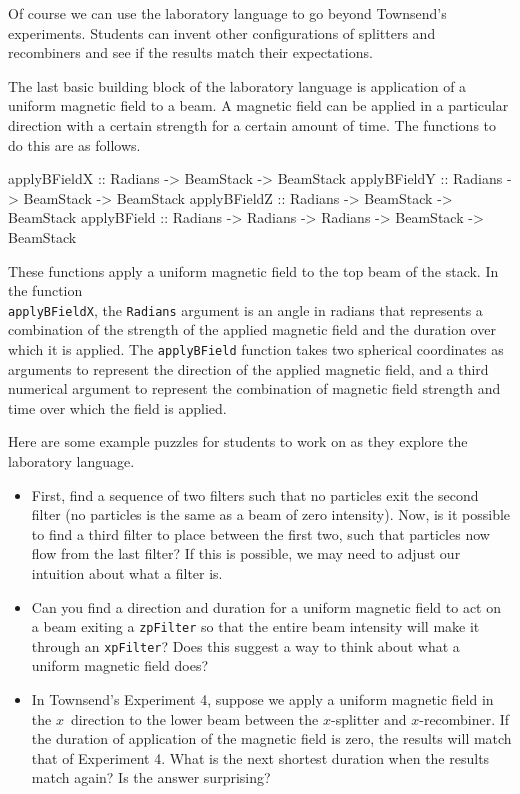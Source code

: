\documentclass{eptcs}
\newcommand{\DataTypeTok}[1]{\textcolor[rgb]{0.56,0.13,0.00}{{#1}}}
\newcommand{\SpecialCharTok}[1]{\textcolor[rgb]{0.25,0.44,0.63}{{#1}}}
\newcommand{\FunctionTok}[1]{\textcolor[rgb]{0.02,0.16,0.49}{{#1}}}
\begin{document}
Of course we can use the laboratory language to go beyond Townsend's
experiments.  Students can invent other configurations of splitters
and recombiners and see if the results match their expectations.

The last basic building block of the laboratory language
is application of a uniform magnetic field to a beam.
A magnetic field can be applied in a particular direction
with a certain strength for a certain amount of time.
The functions to do this are as follows.
\begin{Highlighting}[]
\FunctionTok{applyBFieldX} \SpecialCharTok{::} \DataTypeTok{Radians} \SpecialCharTok{->} \DataTypeTok{BeamStack} \SpecialCharTok{->} \DataTypeTok{BeamStack}
\FunctionTok{applyBFieldY} \SpecialCharTok{::} \DataTypeTok{Radians} \SpecialCharTok{->} \DataTypeTok{BeamStack} \SpecialCharTok{->} \DataTypeTok{BeamStack}
\FunctionTok{applyBFieldZ} \SpecialCharTok{::} \DataTypeTok{Radians} \SpecialCharTok{->} \DataTypeTok{BeamStack} \SpecialCharTok{->} \DataTypeTok{BeamStack}
\FunctionTok{applyBField}  \SpecialCharTok{::} \DataTypeTok{Radians} \SpecialCharTok{->} \DataTypeTok{Radians} \SpecialCharTok{->} \DataTypeTok{Radians} \SpecialCharTok{->} \DataTypeTok{BeamStack} \SpecialCharTok{->} \DataTypeTok{BeamStack}
\end{Highlighting}
These functions apply a uniform magnetic field to the top beam of the stack.
In the function \\
\FunctionTok{\texttt{applyBFieldX}}, the \DataTypeTok{\texttt{Radians}}
argument is an angle in radians that represents a combination of the strength
of the applied magnetic field and the duration over which it is applied.
The \FunctionTok{\texttt{applyBField}} function takes two spherical coordinates as
arguments to represent the direction of the applied magnetic field, and a third
numerical argument to represent the combination of magnetic field strength and
time over which the field is applied.

Here are some example puzzles for students to work on as they
explore the laboratory language.
\begin{itemize}
\item
First, find a sequence of two filters such that no
particles exit the second filter (no particles is the
same as a beam of zero intensity).
Now, is it possible to find a third filter to place
between the first two, such that particles now
flow from the last filter?  If this is possible,
we may need to adjust our intuition about what
a filter is.
\item
Can you find a direction and duration for a uniform magnetic
field to act on a beam exiting a \FunctionTok{\texttt{zpFilter}}
so that the entire beam intensity will make it through an
\FunctionTok{\texttt{xpFilter}}?
Does this suggest a way to think about what a uniform magnetic
field does?
\item
In Townsend's Experiment 4, suppose we apply a uniform magnetic field
in the $x$~direction
to the lower beam between the $x$-splitter and $x$-recombiner.
If the duration of application of the magnetic field is zero,
the results will match that of Experiment 4.  What is the next shortest
duration when the results match again?
Is the answer surprising?
\end{itemize}
\end{document}
